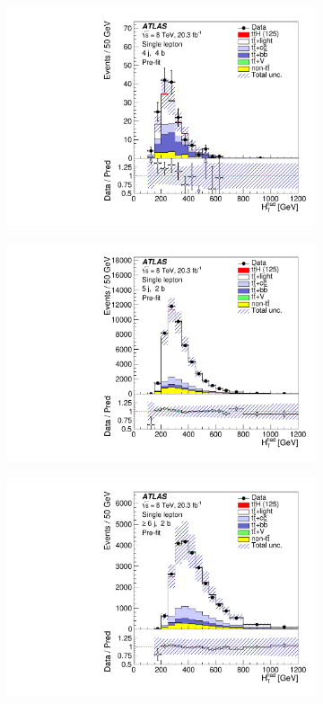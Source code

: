 \begin{figure}[tpb!]
  \begin{subfigure}{0.44\textwidth}
  \includegraphics[width=\textwidth]{Analysis/Figures_ttH/HTHad_4jetex4btagin8TeV_before.pdf}
  \caption{}\end{subfigure}
  \begin{subfigure}{0.44\textwidth}
  \includegraphics[width=\textwidth]{Analysis/Figures_ttH/HTHad_5jetex2btagex8TeV_before.pdf}
  \caption{}\end{subfigure}
  \begin{subfigure}{0.44\textwidth}
  \includegraphics[width=\textwidth]{Analysis/Figures_ttH/HTHad_6jetin2btagex8TeV_before.pdf}

\end{subfigure}
\end{figure}
